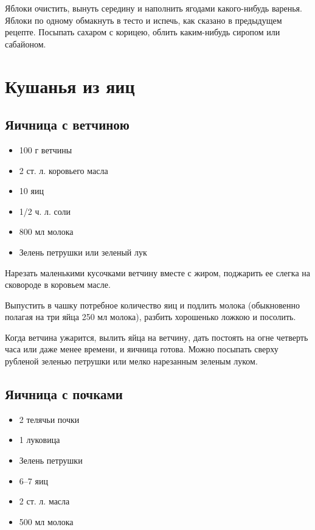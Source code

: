 Яблоки очистить, вынуть середину и наполнить ягодами какого-нибудь варенья. Яблоки по одному обмакнуть в тесто и испечь, как сказано в предыдущем рецепте. Посыпать сахаром с корицею, облить каким-нибудь сиропом или сабайоном.

\newpage
\section{Кушанья из яиц}

\subsection{Яичница с ветчиною}

\begin{itemize}
	\item 100 г ветчины 
    \item 2 ст. л. коровьего масла 
    \item 10 яиц 
    \item 1/2 ч. л. соли 
    \item 800 мл молока 
    \item Зелень петрушки или зеленый лук
\end{itemize}

Нарезать маленькими кусочками ветчину вместе с жиром, поджарить ее слегка на сковороде в коровьем масле.

Выпустить в чашку потребное количество яиц и подлить молока (обыкновенно полагая на три яйца 250 мл молока), разбить хорошенько ложкою и посолить.

Когда ветчина ужарится, вылить яйца на ветчину, дать постоять на огне четверть часа или даже менее времени, и яичница готова. Можно посыпать сверху рубленой зеленью петрушки или мелко нарезанным зеленым луком.

\subsection{Яичница с почками}

\begin{itemize}
	\item 2 телячьи почки 
    \item 1 луковица 
    \item Зелень петрушки 
    \item 6–7 яиц 
    \item 2 ст. л. масла 
    \item 500 мл молока
\end{itemize}

